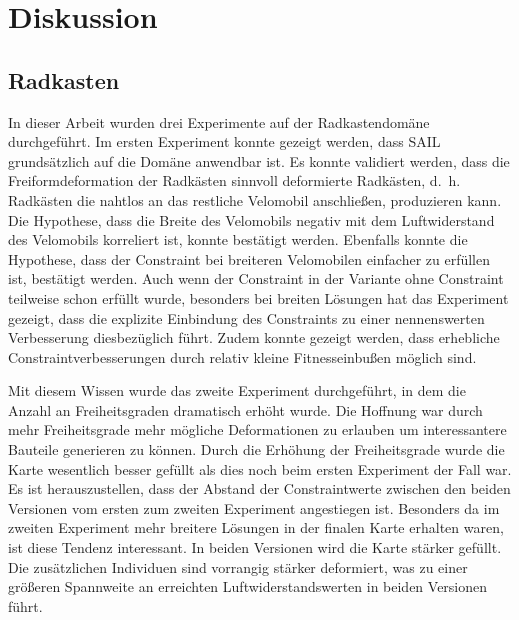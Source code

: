 \section{Diskussion}

\subsection{Radkasten}

In dieser Arbeit wurden drei Experimente auf der Radkastendomäne durchgeführt.
Im ersten Experiment konnte gezeigt werden, dass SAIL grundsätzlich auf die Domäne anwendbar ist.
Es konnte validiert werden, dass die Freiformdeformation der Radkästen sinnvoll deformierte Radkästen, d.~h. Radkästen die nahtlos an das restliche Velomobil anschließen, produzieren kann.
Die Hypothese, dass die Breite des Velomobils negativ mit dem Luftwiderstand des Velomobils korreliert ist, konnte bestätigt werden.
Ebenfalls konnte die Hypothese, dass der Constraint bei breiteren Velomobilen einfacher zu erfüllen ist, bestätigt werden.
Auch wenn der Constraint in der Variante ohne Constraint teilweise schon erfüllt wurde, besonders bei breiten Lösungen hat das Experiment gezeigt, dass die explizite Einbindung des Constraints zu einer nennenswerten Verbesserung diesbezüglich führt.
Zudem konnte gezeigt werden, dass erhebliche Constraintverbesserungen durch relativ kleine Fitnesseinbußen möglich sind.

Mit diesem Wissen wurde das zweite Experiment durchgeführt, in dem die Anzahl an Freiheitsgraden dramatisch erhöht wurde.
Die Hoffnung war durch mehr Freiheitsgrade mehr mögliche Deformationen zu erlauben um interessantere Bauteile generieren zu können.
Durch die Erhöhung der Freiheitsgrade wurde die Karte wesentlich besser gefüllt als dies noch beim ersten Experiment der Fall war.
Es ist herauszustellen, dass der Abstand der Constraintwerte zwischen den beiden Versionen vom ersten zum zweiten Experiment angestiegen ist.
Besonders da im zweiten Experiment mehr breitere Lösungen in der finalen Karte erhalten waren, ist diese Tendenz interessant.
In beiden Versionen wird die Karte stärker gefüllt.
Die zusätzlichen Individuen sind vorrangig stärker deformiert, was zu einer größeren Spannweite an erreichten Luftwiderstandswerten in beiden Versionen führt.

